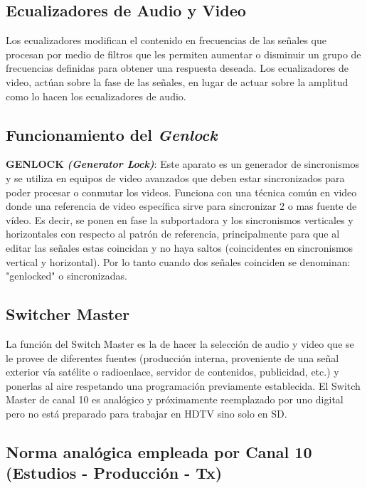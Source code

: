 \documentclass[a4paper,11pt]{article} %
\begin{document}
\newpage
\subsection{Ecualizadores de Audio y Video}

Los ecualizadores modifican el contenido en frecuencias de las señales
que procesan por medio de filtros que les permiten aumentar o disminuir
un grupo de frecuencias definidas para obtener una respuesta deseada.
Los ecualizadores de video, actúan sobre la fase de las señales, en
lugar de actuar sobre la amplitud como lo hacen los ecualizadores de
audio.

\newpage
\subsection{Funcionamiento del \textbf{\emph{Genlock}}}

\textbf{GENLOCK} \textbf{\emph{(Generator Lock)}}: Este aparato es un
generador de sincronismos y se utiliza en equipos de video avanzados que
deben estar sincronizados para poder procesar o conmutar los videos.
Funciona con una técnica común en video donde una referencia de video
específica sirve para sincronizar 2 o mas fuente de vídeo. Es decir, se
ponen en fase la subportadora y los sincronismos verticales y
horizontales con respecto al patrón de referencia, principalmente para
que al editar las señales estas coincidan y no haya saltos (coincidentes
en sincronismos vertical y horizontal). Por lo tanto cuando dos señales
coinciden se denominan: "genlocked" o sincronizadas.

\subsection{Switcher Master}

La función del Switch Master es la de hacer la selección de audio y
video que se le provee de diferentes fuentes (producción interna,
proveniente de una señal exterior vía satélite o radioenlace, servidor
de contenidos, publicidad, etc.)  y ponerlas al aire respetando una
programación previamente establecida. El Switch Master de canal 10 es
analógico y próximamente reemplazado por uno digital pero no está
preparado para trabajar en HDTV sino solo en SD.

\subsection{Norma analógica empleada por Canal 10 (Estudios -
Producci\'on - Tx)}
\end{document}

